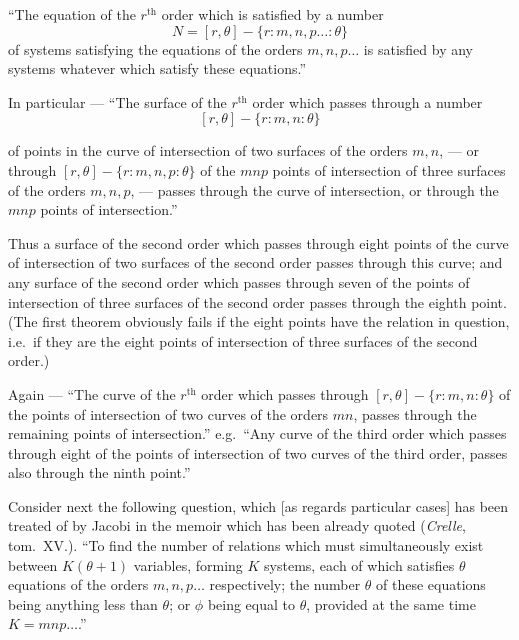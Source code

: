 \documentclass[11pt]{article}
\begin{document}
``The equation of the $r^{\mathrm{th}}$ order which is satisfied by a number
\[
N = [r, \theta] - \{r : m, n, p \ldots : \theta\}
\]
of systems satisfying the equations of the orders $m, n, p \ldots$ is satisfied by any systems whatever which satisfy these equations.''

In particular --- ``The surface of the $r^{\mathrm{th}}$ order which passes through a number
\[
[r, \theta] - \{r : m, n : \theta\}
\]

\newpage
\setcounter{page}{263}

of points in the curve of intersection of two surfaces of the orders $m, n$, --- or through $[r, \theta] - \{r : m, n, p : \theta\}$ of the $mnp$ points of intersection of three surfaces of the orders $m, n, p$, --- passes through the curve of intersection, or through the $mnp$ points of intersection.''

Thus a surface of the second order which passes through eight points of the curve of intersection of two surfaces of the second order passes through this curve; and any surface of the second order which passes through seven of the points of intersection of three surfaces of the second order passes through the eighth point. (The first theorem obviously fails if the eight points have the relation in question, i.e.\ if they are the eight points of intersection of three surfaces of the second order.)

Again --- ``The curve of the $r^{\mathrm{th}}$ order which passes through $[r, \theta] - \{r : m, n : \theta\}$ of the points of intersection of two curves of the orders $mn$, passes through the remaining points of intersection.'' e.g.\ ``Any curve of the third order which passes through eight of the points of intersection of two curves of the third order, passes also through the ninth point.''

Consider next the following question, which [as regards particular cases] has been treated of by Jacobi in the memoir which has been already quoted (\textit{Crelle}, tom.~XV.). ``To find the number of relations which must simultaneously exist between $K(\theta + 1)$ variables, forming $K$ systems, each of which satisfies $\theta$ equations of the orders $m, n, p \ldots$ respectively; the number $\theta$ of these equations being anything less than $\theta$; or $\phi$ being equal to $\theta$, provided at the same time $K = mnp \ldots$.''
\end{document}
